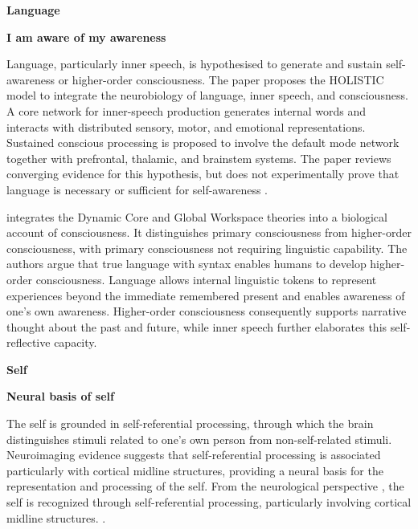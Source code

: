 \documentclass{book}
\providecommand{\ProjectDeepHeading}[2]{%
    \par\medskip\noindent\textbf{#2}\par\smallskip
}
\begin{document}
% 

\ProjectDeepHeading{5}{Language}


\ProjectDeepHeading{8}{I am aware of my awareness}
        Language, particularly inner speech, is hypothesised to generate and sustain self-awareness or higher-order consciousness. The paper proposes the HOLISTIC model to integrate the neurobiology of language, inner speech, and consciousness. A core network for inner-speech production generates internal words and interacts with distributed sensory, motor, and emotional representations. Sustained conscious processing is proposed to involve the default mode network together with prefrontal, thalamic, and brainstem systems. The paper reviews converging evidence for this hypothesis, but does not experimentally prove that language is necessary or sufficient for self-awareness \cite{skipper-2022-a-voice-without-a-mouth-no-more-the-neurobiology-of-language-and-consciousness}.
        
        \cite{edelman-2011-biology-of-consciousness} integrates the Dynamic Core and Global Workspace theories into a biological account of consciousness. It distinguishes primary consciousness from higher-order consciousness, with primary consciousness not requiring linguistic capability. The authors argue that true language with syntax enables humans to develop higher-order consciousness. Language allows internal linguistic tokens to represent experiences beyond the immediate remembered present and enables awareness of one's own awareness. Higher-order consciousness consequently supports narrative thought about the past and future, while inner speech further elaborates this self-reflective capacity.

\ProjectDeepHeading{5}{Self}


\ProjectDeepHeading{8}{Neural basis of self}
      The self is grounded in self-referential processing, through which the brain distinguishes stimuli related to one's own person from non-self-related stimuli. Neuroimaging evidence suggests that self-referential processing is associated particularly with cortical midline structures, providing a neural basis for the representation and processing of the self. From the neurological perspective , the self is recognized through self-referential processing, particularly involving cortical midline structures.
      \cite{northoff-2006-self-referential-processing-in-our-brain-a-meta-analysis-of-imaging-studies-on-the-self}.
\end{document}

